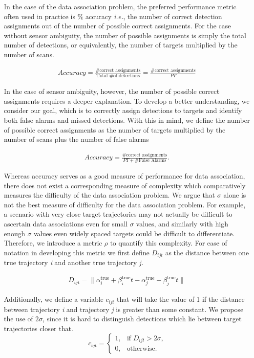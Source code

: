 \documentclass[journal]{IEEEtran}
\begin{document}
In the case of the data association problem, the preferred performance metric often used in practice is \% accuracy \textit{i.e.}, the number of correct detection assignments out of the number of possible correct assignments. For the case without sensor ambiguity, the number of possible assignments is simply the total number of detections, or equivalently, the number of targets multiplied by the number of scans. 

\begin{align}
Accuracy =  \frac{\text{\# correct assignments}}{\text{Total \# of detections}}= \frac{\text{\# correct assignments}}{PT}
\end{align}

In the case of sensor ambiguity, however, the number of possible correct assignments requires a deeper explanation. To develop a better understanding, we consider our goal, which is to correctly assign detections to targets and identify both false alarms and missed detections. With this in mind, we define the number of possible correct assignments as the number of targets multiplied by the number of scans plus the number of false alarms

\begin{align}
Accuracy =  \frac{\text{\# correct assignments}}{PT + \text{\# False Alarms}}.
\end{align}

Whereas accuracy serves as a good measure of performance for data association, there does not exist a corresponding measure of complexity which comparatively measures the difficulty of the data association problem. We argue that $\sigma$ alone is not the best measure of difficulty for the data association problem. For example, a scenario with very close target trajectories may not actually be difficult to ascertain data associations even for small $\sigma$ values, and similarly with high enough $\sigma$ values even widely spaced targets could be difficult to differentiate. Therefore, we introduce a metric $\rho$ to quantify this complexity. For ease of notation in developing this metric we first define $D_{ijt}$ as the distance between one true trajectory \textit{i} and another true trajectory \textit{j}.

\begin{align}
D_{ijt} = \| \alpha^{\text{true}}_{i} + \beta^{\text{true}}_{i}t - \alpha^{\text{true}}_{j} + \beta^{\text{true}}_{j}t \|
\end{align}

Additionally, we define a variable $c_{ijt}$ that will take the value of 1 if the distance between trajectory \textit{i} and trajectory \textit{j} is greater than some constant. We propose the use of $2\sigma$, since it is hard to distinguish detections which lie between target trajectories closer that. 
\[c_{ijt} = 
\begin{cases}
1, & \text{if $D_{ijt} > 2\sigma$,}\\
0, & \text{otherwise.}
\end{cases}\]
\end{document}
